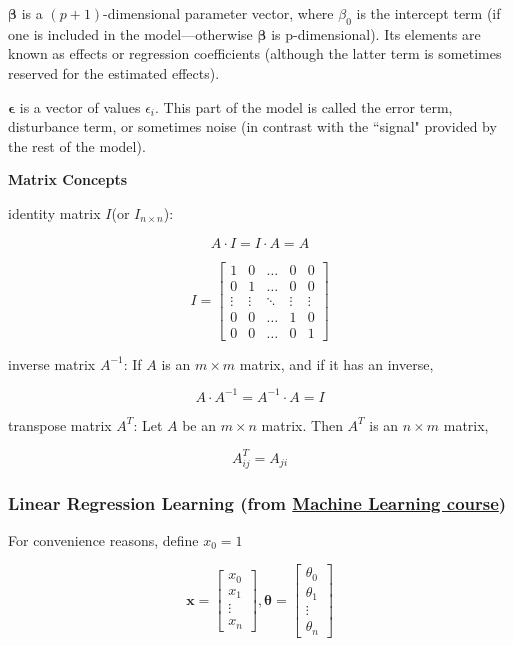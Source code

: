 \documentclass{article}
\begin{document}
\bigskip

\noindent \(\boldsymbol{\beta}\) is a \((p + 1)\)-dimensional parameter vector, where \(\beta_{0}\) is the intercept term (if one is included in the model—otherwise \(\boldsymbol{\beta}\) is p-dimensional). Its elements are known as effects or regression coefficients (although the latter term is sometimes reserved for the estimated effects).

\bigskip

\noindent \(\boldsymbol{\epsilon}\) is a vector of values \(\epsilon_{i}\). This part of the model is called the error term, disturbance term, or sometimes noise (in contrast with the ``signal" provided by the rest of the model).

\bigskip

\noindent \textbf{Matrix Concepts}

\bigskip

\noindent identity matrix \(I\)(or \(I_{n \times n}\)):

\[A \cdot I = I \cdot A = A\]

\[
I = 
\begin{bmatrix}
1 & 0 & \dots & 0 & 0\\
0 & 1 & \dots & 0 & 0\\
\vdots & \vdots & \ddots & \vdots & \vdots\\
0 & 0 & \dots & 1 & 0\\
0 & 0 & \dots & 0 & 1
\end{bmatrix}
\]

\noindent inverse matrix \(A^{-1}\): If \(A\) is an \(m \times m\) matrix, and if it has an inverse,

\[A \cdot A^{-1} = A^{-1} \cdot A = I\]

\noindent transpose matrix \(A^{T}\): Let \(A\) be an \(m \times n\) matrix. Then \(A^T\) is an \(n \times m\) matrix,

\[A^T_{ij} = A_{ji}\]

\subsubsection{Linear Regression Learning (from \href{https://www.coursera.org/learn/machine-learning}{Machine Learning course})}

\noindent For convenience reasons, define \(x_0 = 1\)

\[
\textbf{x} = 
\begin{bmatrix}
x_0\\
x_1\\
\vdots\\
x_n
\end{bmatrix}
,
\boldsymbol{\theta} = 
\begin{bmatrix}
\theta_0\\
\theta_1\\
\vdots\\
\theta_n
\end{bmatrix}
\]
\end{document}
